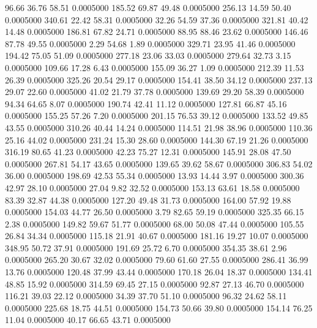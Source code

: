   96.66   36.76   58.51   0.0005000
 185.52   69.87   49.48   0.0005000
 256.13   14.59   50.40   0.0005000
 340.61   22.42   58.31   0.0005000
  32.26   54.59   37.36   0.0005000
 321.81   40.42   14.48   0.0005000
 186.81   67.82   24.71   0.0005000
  88.95   88.46   23.62   0.0005000
 146.46   87.78   49.55   0.0005000
   2.29   54.68    1.89   0.0005000
 329.71   23.95   41.46   0.0005000
 194.42   75.05   51.09   0.0005000
 277.18   23.06   33.03   0.0005000
 279.64   32.73    3.15   0.0005000
 109.66   17.28    6.43   0.0005000
 155.09   36.27    1.09   0.0005000
 212.39   11.53   26.39   0.0005000
 325.26   20.54   29.17   0.0005000
 154.41   38.50   34.12   0.0005000
 237.13   29.07   22.60   0.0005000
  41.02   21.79   37.78   0.0005000
 139.69   29.20   58.39   0.0005000
  94.34   64.65    8.07   0.0005000
 190.74   42.41   11.12   0.0005000
 127.81   66.87   45.16   0.0005000
 155.25   57.26    7.20   0.0005000
 201.15   76.53   39.12   0.0005000
 133.52   49.85   43.55   0.0005000
 310.26   40.44   14.24   0.0005000
 114.51   21.98   38.96   0.0005000
 110.36   25.16   44.02   0.0005000
 231.24   15.30   28.60   0.0005000
 144.30   67.19   21.26   0.0005000
 316.19   80.65   41.23   0.0005000
  42.23   75.27   12.31   0.0005000
 145.91   28.08   47.50   0.0005000
 267.81   54.17   43.65   0.0005000
 139.65   39.62   58.67   0.0005000
 306.83   54.02   36.00   0.0005000
 198.69   42.53   55.34   0.0005000
  13.93   14.44    3.97   0.0005000
 300.36   42.97   28.10   0.0005000
  27.04    9.82   32.52   0.0005000
 153.13   63.61   18.58   0.0005000
  83.39   32.87   44.38   0.0005000
 127.20   49.48   31.73   0.0005000
 164.00   57.92   19.88   0.0005000
 154.03   44.77   26.50   0.0005000
   3.79   82.65   59.19   0.0005000
 325.35   66.15    2.38   0.0005000
 149.82   59.67   51.77   0.0005000
  68.00   50.08   47.44   0.0005000
 105.55   26.84   34.34   0.0005000
 115.18   21.91   40.67   0.0005000
 181.16   19.27   10.07   0.0005000
 348.95   50.72   37.91   0.0005000
 191.69   25.72    6.70   0.0005000
 354.35   38.61    2.96   0.0005000
 265.20   30.67   32.02   0.0005000
  79.60   61.60   27.55   0.0005000
 286.41   36.99   13.76   0.0005000
 120.48   37.99   43.44   0.0005000
 170.18   26.04   18.37   0.0005000
 134.41   48.85   15.92   0.0005000
 314.59   69.45   27.15   0.0005000
  92.87   27.13   46.70   0.0005000
 116.21   39.03   22.12   0.0005000
  34.39   37.70   51.10   0.0005000
  96.32   24.62   58.11   0.0005000
 225.68   18.75   44.51   0.0005000
 154.73   50.66   39.80   0.0005000
 154.14   76.25   11.04   0.0005000
  40.17   66.65   43.71   0.0005000
